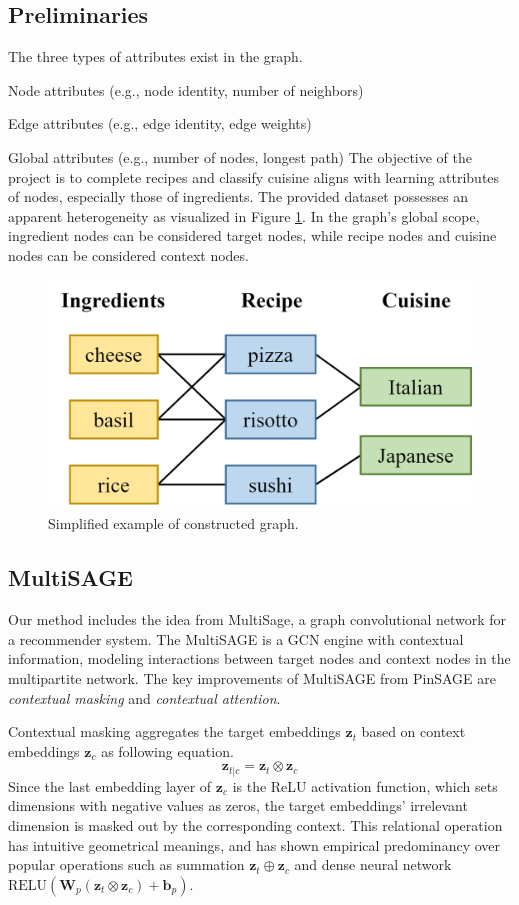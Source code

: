 \subsection{Preliminaries}

The three types of attributes exist in the graph.
\bit
    \item Node attributes (e.g., node identity, number of neighbors)
    \item Edge attributes (e.g., edge identity, edge weights)
    \item Global attributes (e.g., number of nodes, longest path)
\eit
The objective of the project is to complete recipes and classify cuisine aligns with learning attributes of nodes, especially those of ingredients.
The provided dataset possesses an apparent heterogeneity as visualized in Figure \ref{fig:tripartite}.
In the graph's global scope, ingredient nodes can be considered target nodes, while recipe nodes and cuisine nodes can be considered context nodes.

\begin{figure}[btp!]
    \centering
    \includegraphics[width=0.6\linewidth]{FIG/tripartite.png}
    \caption{\label{fig:tripartite}Simplified example of constructed graph.}
\end{figure}

\subsection{MultiSAGE}

Our method includes the idea from MultiSage, a graph convolutional network for a recommender system.
The MultiSAGE\cite{10.1145/3394486.3403293} is a GCN engine with contextual information, modeling interactions between target nodes and context nodes in the multipartite network.
The key improvements of MultiSAGE from PinSAGE are \emph{contextual masking} and \emph{contextual attention}.

Contextual masking aggregates the target embeddings $\mathbf{z}_t$ based on context embeddings $\mathbf{z}_c$ as following equation.
\begin{equation}
    \mathbf{z}_{t|c} = \mathbf{z}_t \otimes \mathbf{z}_c
\end{equation}
Since the last embedding layer of $\mathbf{z}_c$ is the ReLU activation function, which sets dimensions with negative values as zeros, the target embeddings' irrelevant dimension is masked out by the corresponding context. This relational operation has intuitive geometrical meanings, and has shown empirical predominancy over popular operations such as summation $\mathbf{z}_t \oplus \mathbf{z}_c$ and dense neural network $\text{RELU}(\mathbf{W}_p(\mathbf{z}_t \otimes \mathbf{z}_c) + \mathbf{b}_p)$.

